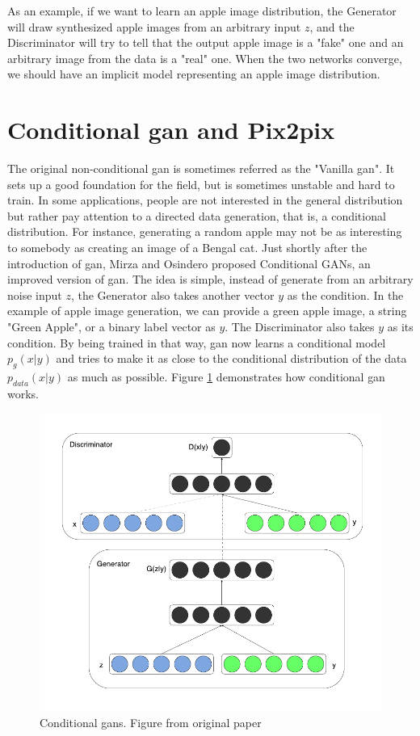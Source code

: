 As an example, if we want to learn an apple image distribution, the Generator will draw
synthesized apple images from an arbitrary input $z$, and the Discriminator will try to tell
that the output apple image is a "fake" one and an arbitrary image from the data is a "real"
one. When the two networks converge, we should have an implicit model representing an apple
image distribution.

\section{Conditional \acrshort{gan} and Pix2pix}

The original non-conditional \acrshort{gan} is sometimes referred as the "Vanilla
\acrshort{gan}". It sets up a good foundation for the field, but is sometimes unstable and
hard to train. In some applications, people are not interested in the general distribution
but rather pay attention to a directed data generation, that is, a conditional
distribution. For instance, generating a random apple may not be as interesting to somebody
as creating an image of a Bengal cat. Just shortly after the introduction of
\acrshort{gan}, Mirza and Osindero \cite{cogan} proposed Conditional GANs, an improved
version of \acrshort{gan}. The idea is simple, instead of generate from an arbitrary noise
input $z$, the Generator also takes another vector $y$ as the condition. In the example of
apple image generation, we can provide a green apple image, a string "Green Apple", or a binary
label vector as $y$. The Discriminator also takes $y$ as its condition. By being trained
in that way, \acrshort{gan} now learns a conditional model $p_{g}(x|y)$ and tries to make
it as close to the conditional distribution of the data $p_{data}(x|y)$ as much as
possible. Figure \ref{fig:co_gan_model} demonstrates how conditional \acrshort{gan} works.

\begin{figure}[h]
	\centering
	\includegraphics[width=0.5\linewidth]{img/co_gan_model}
	\caption{Conditional \acrshort{gan}s. Figure from original paper \cite{cogan}}
	\label{fig:co_gan_model}
\end{figure}

